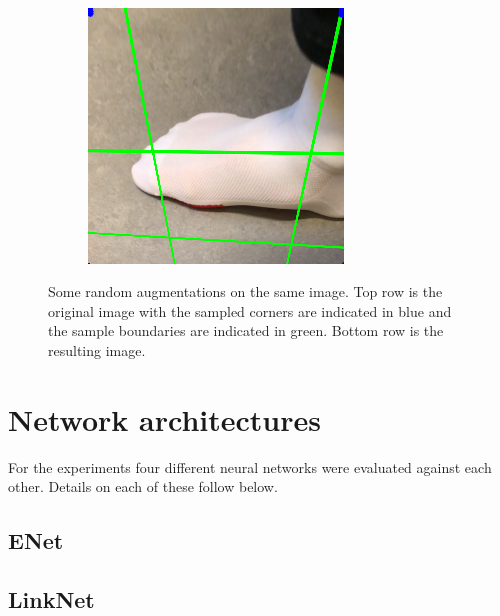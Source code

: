 \documentclass{kththesis}
\begin{document}
\begin{figure}[h]
\begin{subfigure}[b]{0.3\textwidth}
      \end{subfigure}
    ~
    \begin{subfigure}[b]{0.3\textwidth}
        \includegraphics[width=\textwidth]{augmented3}
      \end{subfigure}
      \caption{Some random augmentations on the same image. Top row is the
        original image with the sampled corners are indicated in blue and
        the sample boundaries are indicated in green. Bottom row is the
        resulting image.}\label{fig:augment}
\end{figure}


\section{Network architectures}
For the experiments four different neural networks were evaluated against each
other. Details on each of these follow below.

\subsection{ENet}

\subsection{LinkNet}
\end{document}
